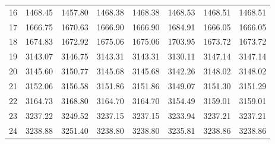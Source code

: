 \documentclass[10pt,oneside]{article}
\begin{document}
\begin{table}[h!]
\begin{tabular}{cccccccc}
16 &   1468.45 & 1457.80 & 1468.38 & 1468.38 &      1468.53 & 1468.51 & 1468.51 \\
17 &   1666.75 & 1670.63 & 1666.90 & 1666.90 &      1684.91 & 1666.05 & 1666.05 \\
18 &   1674.83 & 1672.92 & 1675.06 & 1675.06 &      1703.95 & 1673.72 & 1673.72 \\
19 &   3143.07 & 3146.75 & 3143.31 & 3143.31 &      3130.11 & 3147.14 & 3147.14 \\
20 &   3145.60 & 3150.77 & 3145.68 & 3145.68 &      3142.26 & 3148.02 & 3148.02 \\
21 &   3152.06 & 3156.58 & 3151.86 & 3151.86 &      3149.07 & 3151.30 & 3151.29 \\
22 &   3164.73 & 3168.80 & 3164.70 & 3164.70 &      3154.49 & 3159.01 & 3159.01 \\
23 &   3237.22 & 3249.52 & 3237.15 & 3237.15 &      3233.94 & 3237.21 & 3237.21 \\
24 &   3238.88 & 3251.40 & 3238.80 & 3238.80 &      3235.81 & 3238.86 & 3238.86 \\
\bottomrule
\end{tabular}
\end{table}

\clearpage
\end{document}
